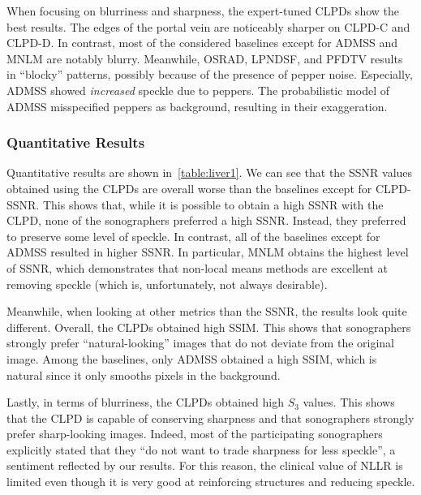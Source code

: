 When focusing on blurriness and sharpness, the expert-tuned CLPDs show the best results.
The edges of the portal vein are noticeably sharper on CLPD-C and CLPD-D.
In contrast, most of the considered baselines except for ADMSS and MNLM are notably blurry.
Meanwhile, OSRAD, LPNDSF, and PFDTV results in ``blocky'' patterns, possibly because of the presence of pepper noise. 
Especially, ADMSS showed \textit{increased} speckle due to peppers.
The probabilistic model of ADMSS misspecified peppers as background, resulting in their exaggeration.


%
\subsubsection{Quantitative Results}
Quantitative results are shown in~\cref{table:liver1}.
We can see that the SSNR values obtained using the CLPDs are overall worse than the baselines except for CLPD-SSNR.
This shows that, while it is possible to obtain a high SSNR with the CLPD, none of the sonographers preferred a high SSNR.
Instead, they preferred to preserve some level of speckle.
In contrast, all of the baselines except for ADMSS resulted in higher SSNR.
In particular, MNLM obtains the highest level of SSNR, which demonstrates that non-local means methods are excellent at removing speckle (which is, unfortunately, not always desirable).

Meanwhile, when looking at other metrics than the SSNR, the results look quite different.
Overall, the CLPDs obtained high SSIM.
This shows that sonographers strongly prefer ``natural-looking'' images that do not deviate from the original image.
Among the baselines, only ADMSS obtained a high SSIM, which is natural since it only smooths pixels in the background.

Lastly, in terms of blurriness, the CLPDs obtained high \(S_3\) values.
This shows that the CLPD is capable of conserving sharpness and that sonographers strongly prefer sharp-looking images.
Indeed, most of the participating sonographers explicitly stated that they ``do not want to trade sharpness for less speckle'', a sentiment reflected by our results.
For this reason, the clinical value of NLLR is limited even though it is very good at reinforcing structures and reducing speckle.

